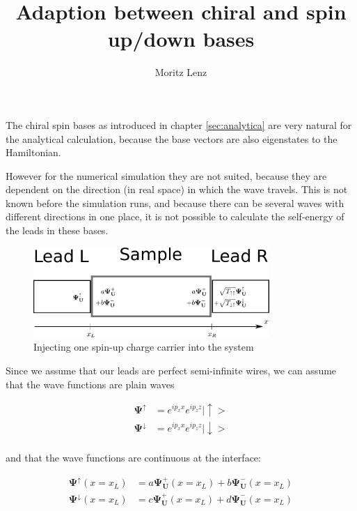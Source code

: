 \documentclass[11pt]{article}
\author{Moritz Lenz}
\title{Adaption between chiral and spin up/down bases}
\begin{document}
\maketitle

The chiral spin bases as introduced in chapter \ref{sec:analytica} are very
natural for the analytical calculation, because the
base vectors are also eigenstates to the Hamiltonian.

However for the numerical simulation they are not suited, because they are
dependent on the direction (in real space) in which the wave travels. This
is not known before the simulation runs, and because there can be several
waves with different directions in one place, it is not possible to calculate
the self-energy of the leads in these bases.

\begin{figure}
    \begin{center}
    \includegraphics[width=0.8\textwidth]{adapting-pic.pdf}
    \end{center}
    \caption{Injecting one spin-up charge carrier into the system}
\end{figure}


Since we assume that our leads are perfect semi-infinite wires, we can assume
that the wave functions are plain waves

\begin{align*}
    \mathbf{\Psi^\uparrow}   &=  e^{i p_x x} e^{i p_z z} |\uparrow> \\
    \mathbf{\Psi^\downarrow} &=  e^{i p_x x} e^{i p_z z} |\downarrow> \\
\end{align*}

and that the wave functions are continuous at the interface:

\begin{align*}
    \mathbf{\Psi^\uparrow}(x=x_L) &=
        a \mathbf{\Psi^+_U}(x=x_L) + b  \mathbf{\Psi^-_U}(x=x_L)\\
    \mathbf{\Psi^\downarrow}(x=x_L) &=
        c \mathbf{\Psi^+_U}(x=x_L) + d  \mathbf{\Psi^-_U}(x=x_L)
\end{align*}
\end{document}
